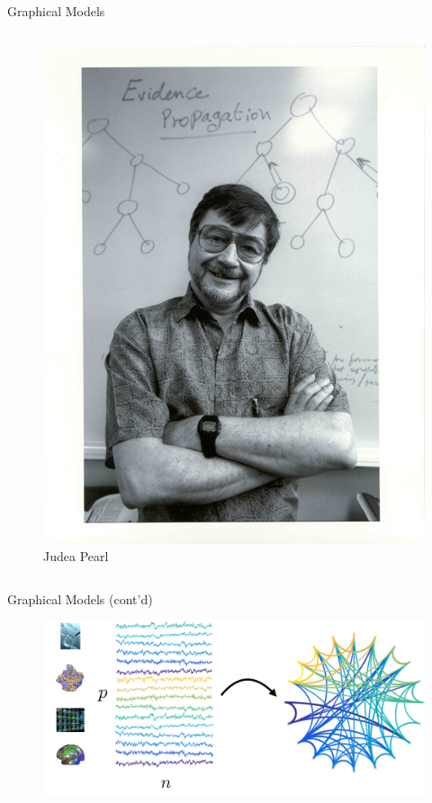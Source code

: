 \documentclass{beamer}
\begin{document}
\begin{frame}{Graphical Models}
\begin{columns}
    \begin{column}{0.32\textwidth}
      \begin{figure}[ht]
        \centering
        \includegraphics[width=1\textwidth,keepaspectratio]{img/judea_pearl}
        \caption*{\tiny{Judea Pearl\label{fig:judea-pearl}}}
      \end{figure}
    \end{column}
  \end{columns}
\end{frame}

\begin{frame}{Graphical Models (cont'd)}
  \begin{figure}[ht]
    \centering
    \includegraphics[width=1\textwidth,keepaspectratio]{img/skggm_network}
    \caption*{\label{fig:network}}
  \end{figure}
\end{frame}
\end{document}
